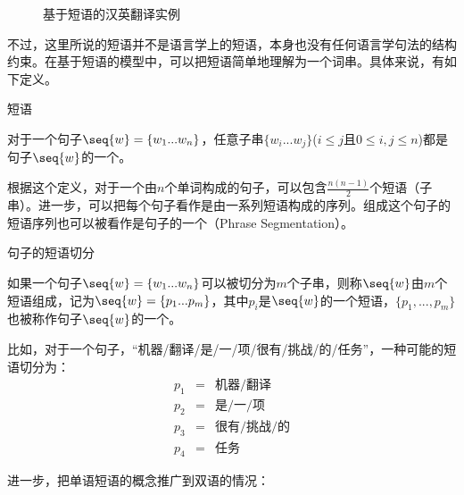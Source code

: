 \begin{figure}[htp]
\centering

\caption{基于短语的汉英翻译实例}
\label{fig:7-6}
\end{figure}

\parinterval 不过，这里所说的短语并不是语言学上的短语，本身也没有任何语言学句法的结构约束。在基于短语的模型中，可以把短语简单地理解为一个词串。具体来说，有如下定义。

\vspace{0.5em}
\begin{definition} 短语

{\small
对于一个句子$\seq{w} = \{ w_1...w_n \} $，任意子串$\{ w_i...w_j\}$($i\leq j$且$0\leq i,j\leq n$)都是句子$\seq{w}$的一个{\small{}}。
}
\end{definition}

\parinterval 根据这个定义，对于一个由$n$个单词构成的句子，可以包含$\frac{n(n-1)}{2}$个短语（子串）。进一步，可以把每个句子看作是由一系列短语构成的序列。组成这个句子的短语序列也可以被看作是句子的一个{\small{}}（Phrase Segmentation）。

\vspace{0.5em}
\begin{definition} 句子的短语切分

{\small
如果一个句子$\seq{w} = \{ w_1...w_n\}$可以被切分为$m$个子串，则称$\seq{w}$由$m$个短语组成，记为$\seq{w} =\{ p_1...p_m \} $，其中$p_i$是$\seq{w}$的一个短语，$\{p_1,...,p_m\}$也被称作句子$\seq{w}$的一个{\small{}}。
}
\end{definition}

\parinterval 比如，对于一个句子，“机器/翻译/是/一/项/很有/挑战/的/任务”，一种可能的短语切分为：
\begin{eqnarray}
p_1 &=& \text{机器}/\text{翻译} \nonumber \\
p_2 &=& \text{是}/\text{一}/\text{项} \nonumber \\
p_3 &=& \text{很有}/\text{挑战}/\text{的} \nonumber \\
p_4 &=& \text{任务}\nonumber
\end{eqnarray}

\parinterval 进一步，把单语短语的概念推广到双语的情况：

